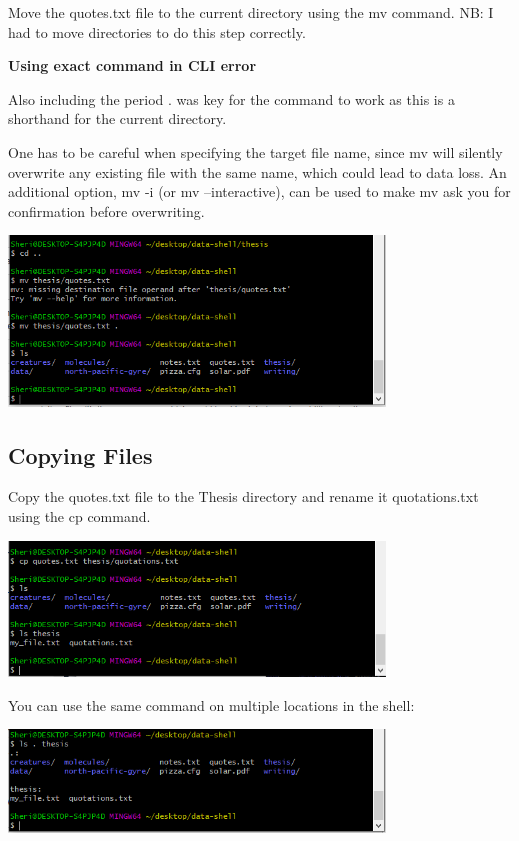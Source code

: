 \documentclass{article}
\begin{document}
Move the quotes.txt file to the current directory using the mv command.
NB: I had to move directories to do this step correctly.

\textbf{Using exact command in CLI error}
\label{Using exact commands in CLI}

Also including the period . was key for the command to work as this is a shorthand for the current directory.

One has to be careful when specifying the target file name, since mv will silently overwrite any existing file with the same name, which could lead to data loss. An additional option, mv -i (or mv --interactive), can be used to make mv ask you for confirmation before overwriting.

\includegraphics[width=10cm]{Images/GitBash_017.PNG}

\subsection{Copying Files}

Copy the quotes.txt file to the Thesis directory and rename it quotations.txt using the cp command.

\includegraphics[width=10cm]{Images/GitBash_018.PNG}

You can use the same command on multiple locations in the shell:

\includegraphics[width=10cm]{Images/GitBash_020.PNG}
\end{document}
